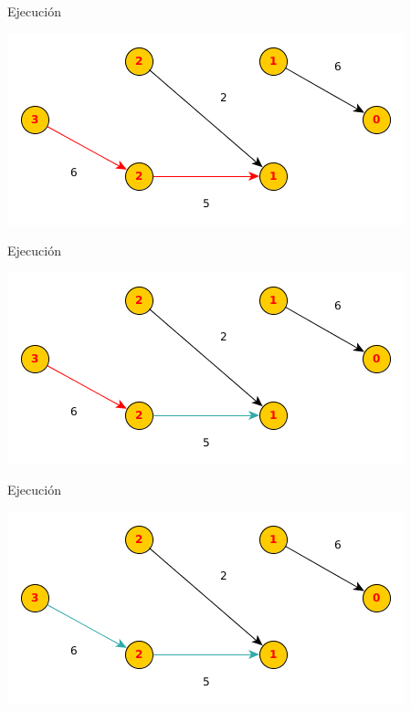 \documentclass{beamer}
\begin{document}
\begin{frame}{Ejecución}

    
    \includegraphics[scale=0.6]{dinitz/dinitz14.png}
    
\end{frame}

\begin{frame}{Ejecución}

    
    \includegraphics[scale=0.6]{dinitz/dinitz15.png}
    
\end{frame}

\begin{frame}{Ejecución}

    \includegraphics[scale=0.6]{dinitz/dinitz16.png}
    
\end{frame}
\end{document}

